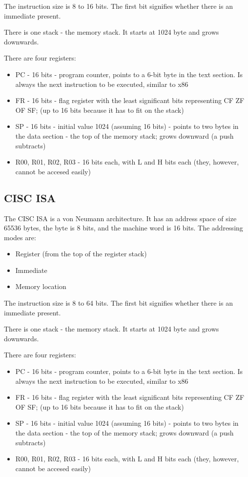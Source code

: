 \documentclass[conference]{IEEEtran}
\begin{document}
The instruction size is 8 to 16 bits. The first bit signifies whether there is an immediate present.

There is one stack - the memory stack. It starts at 1024 byte and grows downwards.

There are four registers:
\begin{itemize}
	\item PC - 16 bits - program counter, points to a 6-bit byte in the text section. Is always the next instruction to be executed, similar to x86
	\item FR - 16 bits - flag register with the least significant bits representing CF ZF OF SF; (up to 16 bits because it has to fit on the stack)
	\item SP - 16 bits - initial value 1024 (assuming 16 bits) - points to two bytes in the data section - the top of the memory stack; grows downward (a push subtracts)
	\item R00, R01, R02, R03 - 16 bits each, with L and H bits each (they, however, cannot be accesed easily)
\end{itemize}

\subsection {CISC ISA \cite{b5}}
The CISC ISA is a von Neumann architecture.
It has an address space of size 65536 bytes, the byte is 8 bits,
and the machine word is 16 bits. The addressing modes are:
\begin{itemize}
	\item Register (from the top of the register stack)
	\item Immediate
	\item Memory location
\end{itemize}

The instruction size is 8 to 64 bits. The first bit signifies whether there is an immediate present.

There is one stack - the memory stack. It starts at 1024 byte and grows downwards.

There are four registers:
\begin{itemize}
	\item PC - 16 bits - program counter, points to a 6-bit byte in the text section. Is always the next instruction to be executed, similar to x86
	\item FR - 16 bits - flag register with the least significant bits representing CF ZF OF SF; (up to 16 bits because it has to fit on the stack)
	\item SP - 16 bits - initial value 1024 (assuming 16 bits) - points to two bytes in the data section - the top of the memory stack; grows downward (a push subtracts)
	\item R00, R01, R02, R03 - 16 bits each, with L and H bits each (they, however, cannot be accesed easily)
\end{itemize}
\end{document}
